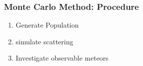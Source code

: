 \begin{frame}
    \frametitle{Monte Carlo Method: Procedure}
    \begin{enumerate}
        \item Generate Population
        \item simulate scattering
        \item Investigate observable meteors
    \end{enumerate}
\end{frame}